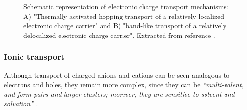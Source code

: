 

\begin{figure}[h]
	\centering
	\hspace{2em}
	\caption{Schematic representation of electronic charge transport mechanisms: A) "Thermally activated hopping transport of a relatively localized electronic charge carrier" and B) "band-like transport of a relatively delocalized electronic charge carrier". Extracted from reference \cite{paulsenOrganicMixedIonic2020}.} 
	\label{fig:etrans}
\end{figure}


\subsubsection{Ionic transport}
Although transport of charged anions and cations can be seen analogous to electrons and holes, they remain more complex, since they can be \textit{``multi-valent, and form pairs and larger clusters; morever, they are sensitive to solvent and solvation''} \cite{paulsenOrganicMixedIonic2020}.

